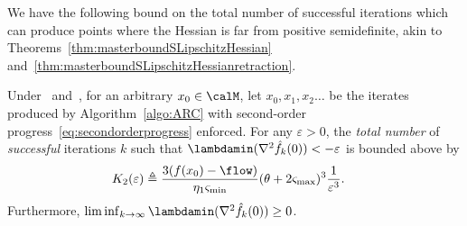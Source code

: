 We have the following bound on the total number of successful iterations which can produce points where the Hessian is far from positive semidefinite, akin to Theorems~\ref{thm:masterboundSLipschitzHessian} and~\ref{thm:masterboundSLipschitzHessianretraction}.
\begin{theorem} \label{thm:masterboundSsecond}
	Under~ and~, for an arbitrary $x_0\in\calM$, let $x_0, x_1, x_2\ldots$ be the iterates produced by Algorithm~\ref{algo:ARC} with second-order progress~\eqref{eq:secondorderprogress} enforced. For any $\varepsilon > 0$, the \emph{total number} of \emph{successful} iterations $k$ such that $\lambdamin(\nabla^2 \hat f_k(0)) < -\varepsilon$ is bounded above by
	\begin{align*}
		K_2(\varepsilon) & \triangleq \frac{3(f(x_0) - \flow)}{\eta_1 \varsigma_{\min}} (\theta + 2\varsigma_{\max})^3 \frac{1}{\varepsilon^3}.
	\end{align*}
	Furthermore, $\liminf_{k \to \infty} \lambdamin(\nabla^2 \hat f_k(0)) \geq 0$.
\end{theorem}
